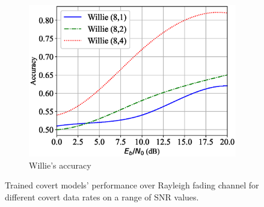 \begin{figure}[tp!]
\begin{subfigure}{0.3\textwidth}
		\includegraphics[width=\linewidth]{figs/willie_accuracy_rayleigh}
		\caption{Willie's accuracy}
		\label{fig:rayleigh_resutls_willie}
	\end{subfigure}
	\caption{Trained covert models' performance over Rayleigh fading channel for different covert data rates on a range of SNR values.}
	\label{fig:rayleigh_resutls}
\end{figure}
